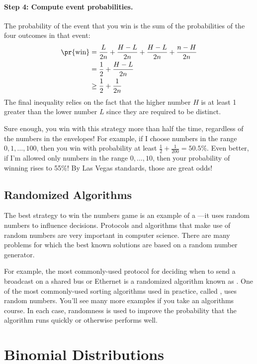 \paragraph{Step 4: Compute event probabilities.}

The probability of the event that you win is the sum of the
probabilities of the four outcomes in that event:
%
\begin{align*}
\pr{\text{win}}
    & = \frac{L}{2n} + \frac{H-L}{2n} + \frac{H-L}{2n}  + \frac{n-H}{2n} \\
    & = \frac{1}{2} + \frac{H-L}{2n} \\
    & \geq \frac{1}{2} + \frac{1}{2n}
\end{align*}
%
The final inequality relies on the fact that the higher number $H$ is
at least 1 greater than the lower number $L$ since they are required
to be distinct.

Sure enough, you win with this strategy more than half the time,
regardless of the numbers in the envelopes!  For example, if I choose
numbers in the range $0, 1, \dots, 100$, then you win with probability at
least $\frac{1}{2} + \frac{1}{200} = 50.5\%$.  Even better, if I'm allowed
only numbers in the range $0, \dots, 10$, then your probability of
winning rises to 55\%!  By Las Vegas standards, those are great odds!

\subsection{Randomized Algorithms}

The best strategy to win the numbers game is an example of a
---it uses random numbers to influence
decisions.  Protocols and algorithms that make use of random numbers
are very important in computer science.  There are many problems for
which the best known solutions are based on a random number generator.

For example, the most commonly-used protocol for deciding when to send
a broadcast on a shared bus or Ethernet is a randomized algorithm
known as .  One of the most commonly-used
sorting algorithms used in practice, called , uses
random numbers.  You'll see many more examples if you take an
algorithms course.  In each case, randomness is used to improve the
probability that the algorithm runs quickly or otherwise performs
well.

\section{Binomial Distributions}\label{binomial_distribution_section}


